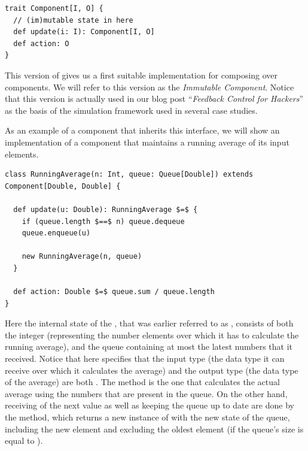 \begin{lstlisting}[style=InlineScalaStyle]
trait Component[I, O] {
  // (im)mutable state in here
  def update(i: I): Component[I, O]
  def action: O
}
\end{lstlisting}

This version of \comp gives us a first suitable implementation for composing over components. We will refer to this version as the \textit{Immutable Component}. Notice that this version is actually used in our blog post ``\textit{Feedback Control for Hackers}'' \cite{heest2015-feedback-for-hackers} as the basis of the simulation framework used in several case studies.

As an example of a component that inherits this interface, we will show an implementation of a component that maintains a running average of its input elements.

\begin{minipage}{\linewidth}
\begin{lstlisting}[style=ScalaStyle, caption={Implementation of \code{RunningAverage} using the \textit{Immutable Component} interface}, label={lst:immutable-runningaverage}]
class RunningAverage(n: Int, queue: Queue[Double]) extends Component[Double, Double] {

  def update(u: Double): RunningAverage $=$ {
    if (queue.length $==$ n) queue.dequeue
    queue.enqueue(u)

    new RunningAverage(n, queue)
  }

  def action: Double $=$ queue.sum / queue.length
}
\end{lstlisting}
\end{minipage}

Here the internal state of the \comp, that was earlier referred to as , consists of both the integer  (representing the number elements over which it has to calculate the running average), and the queue containing at most the latest  numbers that it received. Notice that  here specifies that the input type (the data type it can receive over which it calculates the average) and the output type (the data type of the average) are both . The  method is the one that calculates the actual average using the numbers that are present in the queue. On the other hand, receiving of the next value as well as keeping the queue up to date are done by the  method, which returns a new instance of  with the new state of the queue, including the new element and excluding the oldest element (if the queue's size is equal to ).

